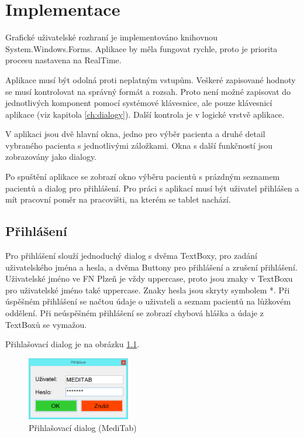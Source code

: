 \chapter{Implementace}

Grafické uživatelské rozhraní je implementováno knihovnou System.Windows.Forms. Aplikace by měla fungovat rychle, proto je priorita procesu nastavena na RealTime.

Aplikace musí být odolná proti neplatným vstupům. Veškeré zapisované hodnoty se musí kontrolovat na správný formát a rozsah. Proto není možné zapisovat do jednotlivých komponent pomocí systémové klávesnice, ale pouze klávesnicí aplikace (viz kapitola \ref{ch:dialogy}). Další kontrola je v logické vrstvě aplikace.

V aplikaci jsou dvě hlavní okna, jedno pro výběr pacienta a druhé detail vybraného pacienta s jednotlivými záložkami. Okna s další funkčností jsou zobrazovány jako dialogy.

Po spuštění aplikace se zobrazí okno výběru pacientů s prázdným seznamem pacientů a dialog pro přihlášení. Pro práci s aplikací musí být uživatel přihlášen a mít pracovní poměr na pracovišti, na kterém se tablet nachází.


\section{Přihlášení}

Pro přihlášení slouží jednoduchý dialog s dvěma TextBoxy, pro zadání uživatelského jména a hesla, a dvěma Buttony pro přihlášení a zrušení přihlášení. Uživatelské jméno ve FN Plzeň je vždy uppercase, proto jsou znaky v TextBoxu pro uživatelské jméno také uppercase. Znaky hesla jsou skryty symbolem *. Při úspěšném přihlášení se načtou údaje o uživateli a seznam pacientů na lůžkovém oddělení. Při neúspěšném přihlášení se zobrazí chybová hláška a údaje z TextBoxů se vymažou.

Přihlašovací dialog je na obrázku \ref{fig:login}.

\begin{figure}[H]
	\centering
	\includegraphics[width=0.4\textwidth]{img/meditab/login.eps}
	\caption{Přihlašovací dialog (MediTab)}
  \label{fig:login}
\end{figure}


